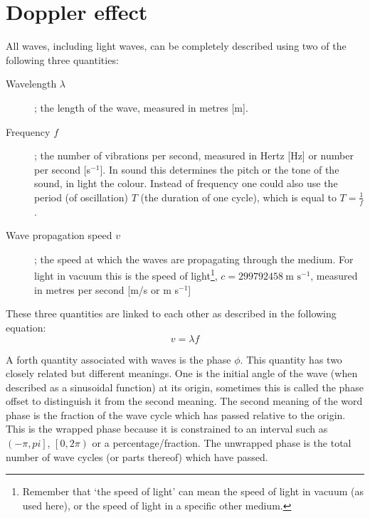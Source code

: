 \section{Doppler effect}
All waves, including light waves, can be completely described using two of the following three quantities:
\begin{description}
\item[Wavelength $\lambda$]; the length of the wave, measured in metres [m].
\item[Frequency $f$]; the number of vibrations per second, measured in Hertz [Hz] or number per second [s$^{-1}$]. In sound this determines the pitch or the tone of the sound, in light the colour. Instead of frequency one could also use the period (of oscillation) $T$ (the duration of one cycle), which is equal to $T=\frac{1}{f}$.
\item[Wave propagation speed $v$];  the speed at which the waves are propagating through the medium. For light in vacuum this is the speed of light\footnote{Remember that `the speed of light' can mean the speed of light in vacuum (as used here), or the speed of light in a specific other medium.}, $c=299792458~\mbox{m s}^{-1}$, measured in metres per second [m/s or m s$^{-1}$]
\end{description}
These three quantities are linked to each other as described in the following equation:
\begin{equation} v = \lambda f \label{eq:wave}
\end{equation}

A forth quantity associated with waves is the phase $\phi$. This quantity has two closely related but different meanings. One is the initial angle of the wave (when described as a sinusoidal function) at its origin, sometimes this is called the phase offset to distinguish it from the second meaning. The second meaning of the word phase is the fraction of the wave cycle which has passed relative to the origin. This is the wrapped phase because it is constrained to an interval such as $\left( -\pi , pi\right]$, $\left[ 0,2\pi\right)$ or a percentage/fraction. The unwrapped phase is the total number of wave cycles (or parts thereof) which have passed.

